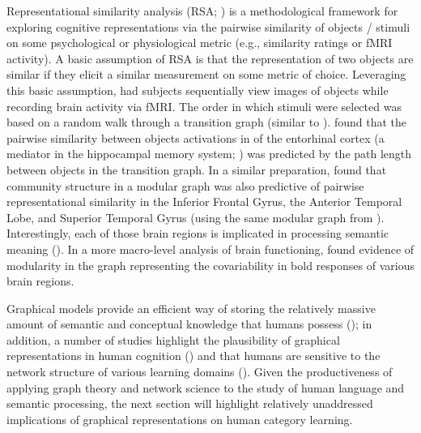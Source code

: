 \documentclass[12pt]{article}
\let\oldcite=\cite
\let\oldtextcite=\textcite
\renewcommand{\cite}[1]{\textcolor[rgb]{0, .121, .388}{\oldcite{#1}}}
\renewcommand{\textcite}[1]{\textcolor[rgb]{0, .121, .388}{\oldtextcite{#1}}}
\begin{document}
Representational similarity analysis (RSA; \cite{kriegeskorte2008representational}) is a methodological framework for exploring cognitive representations via the pairwise similarity of objects / stimuli on some psychological or physiological metric (e.g., similarity ratings or fMRI activity). A basic assumption of RSA is that the representation of two objects are similar if they elicit a similar measurement on some metric of choice. Leveraging this basic assumption, \textcite{garvert2017map} had subjects sequentially view images of objects while recording brain activity via fMRI. The order in which stimuli were selected was based on a random walk through a transition graph (similar to \cite{karuza2019human,kahn2018network}). \textcite{garvert2017map} found that the pairwise similarity between objects activations in of the entorhinal cortex (a mediator in the hippocampal memory system; \cite{witter2011entorhinal}) was predicted by the path length between objects in the transition graph. In a similar preparation, \textcite{schapiro2013neural} found that community structure in a modular graph was also predictive of pairwise representational similarity in the Inferior Frontal Gyrus, the Anterior Temporal Lobe, and Superior Temporal Gyrus (using the same modular graph from \cite{kahn2018network}). Interestingly, each of those brain regions is implicated in processing semantic meaning (\cite{schapiro2013neural}). In a more macro-level analysis of brain functioning, \textcite{bassett2010efficient} found evidence of modularity in the graph representing the covariability in bold responses of various brain regions.

Graphical models provide an efficient way of storing the relatively massive amount of semantic and conceptual knowledge that humans possess (\cite{collins1969retrieval,abbott2012human}); in addition, a number of studies highlight the plausibility of graphical representations in human cognition (\cite{steyvers2005large,garvert2017map,bassett2010efficient}) and that humans are sensitive to the network structure of various learning domains (\cite{karuza2017process,kahn2018network,karuza2019human,chan2009influence,chan2010network,vitevitch2012complex}). Given the productiveness of applying graph theory and network science to the study of human language and semantic processing, the next section will highlight relatively unaddressed implications of graphical representations on human category learning.

\end{document}

